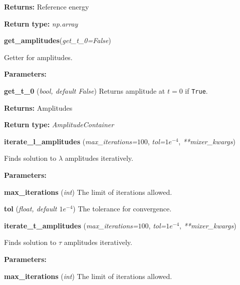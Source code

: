 \begin{tcolorbox}
{\begin{adjustwidth}{4em}{}
        \textbf{Returns:} Reference energy

        \textbf{Return type:} \emph{np.array}
        \end{adjustwidth}
    
    \hspace{2em} \textbf{get\_amplitudes}(\emph{get\_t\_0=False})
        \begin{adjustwidth}{4em}{}
        Getter for amplitudes.

        \textbf{Parameters:} 
        
            \hspace{1.5em} \textbf{get\_t\_0} (\emph{bool, default False}) 
            Returns amplitude at $t=0$ if \lstinline{True}.

        \textbf{Returns:} Amplitudes

        \textbf{Return type:} \emph{AmplitudeContainer}

        \end{adjustwidth}

    \hspace{2em} \textbf{iterate\_l\_amplitudes} 
        (\emph{max\_iterations=$100$}, \emph{tol=$1e^{-4}$}, \emph{**mixer\_kwargs})
        \begin{adjustwidth}{4em}{}
            Finds solution to $\lambda$ amplitudes iteratively.

        \textbf{Parameters:} 
        
        \hspace{1.5em} \textbf{max\_iterations} (\emph{int})
            The limit of iterations allowed.

        \hspace{1.5em} \textbf{tol} (\emph{float, default $1e^{-4}$})
            The tolerance for convergence.

        \end{adjustwidth}
 
    \hspace{2em} \textbf{iterate\_t\_amplitudes} 
        (\emph{max\_iterations=$100$}, \emph{tol=$1e^{-4}$}, \emph{**mixer\_kwargs})
        \begin{adjustwidth}{4em}{}
            Finds solution to $\tau$ amplitudes iteratively.

        \textbf{Parameters:} 
        
        \hspace{1.5em} \textbf{max\_iterations} (\emph{int})
            The limit of iterations allowed.


\end{adjustwidth}}
\end{tcolorbox}
